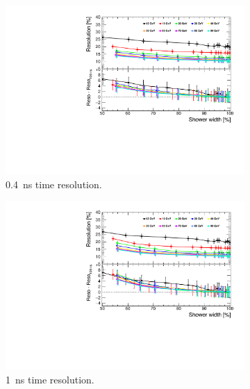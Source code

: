 \begin{figure}[htbp!]
  \centering
  \begin{subfigure}[t]{0.6\textwidth}
    \centering
    \includegraphics[width=1\linewidth]{../Thesis_Plots/ILD/Smearing_0.4ns/Plots/ShowerWidth_Resolution_Smearing1}
    \caption{\SI{0.4}{\nano\second} time resolution.} \label{fig:WidthReso0.4ns}
  \end{subfigure}
  \begin{subfigure}[t]{0.6\textwidth}
    \centering
    \includegraphics[width=1\linewidth]{../Thesis_Plots/ILD/Smearing_1ns/Plots/ShowerWidth_Resolution_Smearing2}
    \caption{\SI{1}{\nano\second} time resolution.} \label{fig:WidthReso1ns}
  \end{subfigure}
  \begin{subfigure}[t]{0.6\textwidth}

\end{subfigure}
\end{figure}
